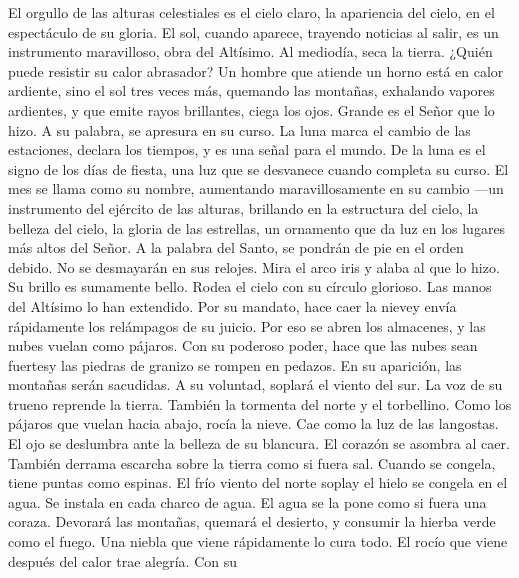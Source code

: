  El orgullo de las alturas celestiales es el cielo claro,
la apariencia del cielo, en el espectáculo de su gloria. 
El sol, cuando aparece, trayendo noticias al salir, es un instrumento
maravilloso, obra del Altísimo.  Al mediodía, seca la
tierra. ¿Quién puede resistir su calor abrasador?  Un
hombre que atiende un horno está en calor ardiente, sino el sol tres
veces más, quemando las montañas, exhalando vapores ardientes, y que
emite rayos brillantes, ciega los ojos.  Grande es el
Señor que lo hizo. A su palabra, se apresura en su curso. 
La luna marca el cambio de las estaciones, declara los tiempos, y es una
señal para el mundo.  De la luna es el signo de los días
de fiesta, una luz que se desvanece cuando completa su curso.
 El mes se llama como su nombre, aumentando
maravillosamente en su cambio ---un instrumento del ejército de las
alturas, brillando en la estructura del cielo,  la belleza
del cielo, la gloria de las estrellas, un ornamento que da luz en los
lugares más altos del Señor.  A la palabra del Santo, se
pondrán de pie en el orden debido. No se desmayarán en sus relojes.
 Mira el arco iris y alaba al que lo hizo. Su brillo es
sumamente bello.  Rodea el cielo con su círculo glorioso.
Las manos del Altísimo lo han extendido.  Por su mandato,
hace caer la nievey envía rápidamente los relámpagos de su juicio.
 Por eso se abren los almacenes, y las nubes vuelan como
pájaros.  Con su poderoso poder, hace que las nubes sean
fuertesy las piedras de granizo se rompen en pedazos.  En
su aparición, las montañas serán sacudidas. A su voluntad, soplará el
viento del sur.  La voz de su trueno reprende la tierra.
También la tormenta del norte y el torbellino. Como los pájaros que
vuelan hacia abajo, rocía la nieve. Cae como la luz de las langostas.
 El ojo se deslumbra ante la belleza de su blancura. El
corazón se asombra al caer.  También derrama escarcha
sobre la tierra como si fuera sal. Cuando se congela, tiene puntas como
espinas.  El frío viento del norte soplay el hielo se
congela en el agua. Se instala en cada charco de agua. El agua se la
pone como si fuera una coraza.  Devorará las montañas,
quemará el desierto, y consumir la hierba verde como el fuego.
 Una niebla que viene rápidamente lo cura todo. El rocío
que viene después del calor trae alegría.  Con su
